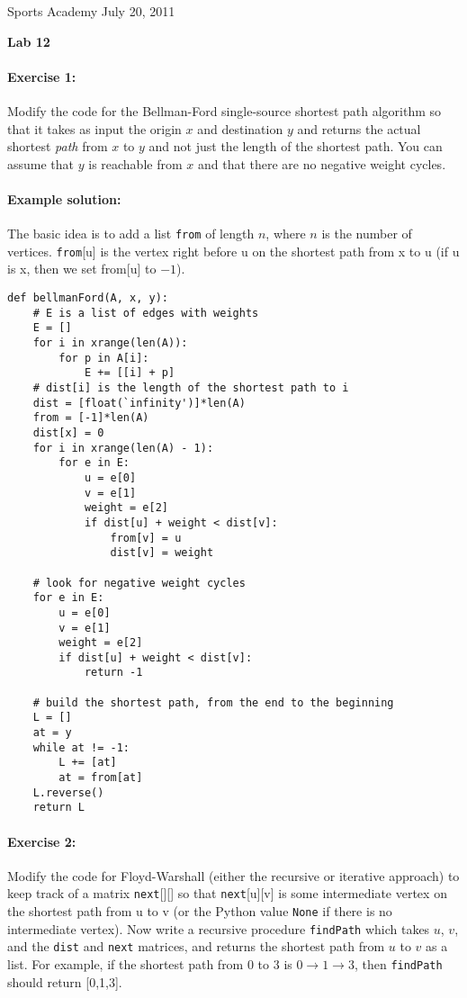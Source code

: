 \documentclass[11pt]{article}
\newlength{\toppush}
\newcommand{\htitle}[2]{\noindent\vspace*{-\toppush}\newline\parbox{6.5in}
 {\large Sports Academy \hfill #1\newline
\hspace*{\fill}{\bf Algorithms and Programming for High Schoolers} \hspace*{\fill} \newline
\mbox{}\hrulefill\mbox{}}\vspace*{1ex}\mbox{}\newline
\begin{center}{\Large\bf #2}\end{center}}
\begin{document}
\htitle{July 20, 2011}{Lab 12}

\paragraph{Exercise 1:}
Modify the code for the Bellman-Ford single-source shortest path
algorithm so that it takes as input the origin $x$ and destination $y$
and returns the actual shortest {\em path} from $x$ to $y$ and not
just the length of the shortest path.  You can assume that $y$ is
reachable from $x$ and that there are no negative weight cycles.

\paragraph{Example solution:}
The basic idea is to add a list \texttt{from} of length $n$, where $n$
is the number of vertices.  \texttt{from}[u] is the vertex right
before u on the shortest path from x to u (if u is x, then we set
from[u] to $-1$).

\begin{verbatim}
def bellmanFord(A, x, y):
    # E is a list of edges with weights
    E = []
    for i in xrange(len(A)):
        for p in A[i]:
            E += [[i] + p]
    # dist[i] is the length of the shortest path to i
    dist = [float(`infinity')]*len(A)
    from = [-1]*len(A)
    dist[x] = 0
    for i in xrange(len(A) - 1):
        for e in E:
            u = e[0]
            v = e[1]
            weight = e[2]
            if dist[u] + weight < dist[v]:
                from[v] = u
                dist[v] = weight

    # look for negative weight cycles
    for e in E:
        u = e[0]
        v = e[1]
        weight = e[2]
        if dist[u] + weight < dist[v]:
            return -1

    # build the shortest path, from the end to the beginning
    L = []
    at = y
    while at != -1:
        L += [at]
        at = from[at]
    L.reverse()
    return L 
\end{verbatim}

\paragraph{Exercise 2:}
Modify the code for Floyd-Warshall (either the recursive or iterative
approach) to keep track of a matrix \texttt{next}[][] so that
\texttt{next}[u][v] is some intermediate vertex on the shortest path
from u to v (or the Python value \texttt{None} if there is no
intermediate vertex).  Now write a recursive procedure
\texttt{findPath} which
takes $u$, $v$, and the \texttt{dist} and \texttt{next} matrices, and
returns the shortest path from $u$ to $v$ as a list.  For example, if
the shortest path from $0$ to $3$ is $0\rightarrow 1\rightarrow 3$,
then \texttt{findPath} should return [0,1,3].
\end{document}
